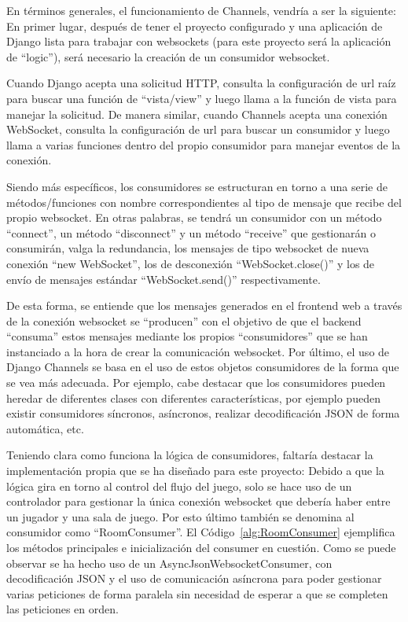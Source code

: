 En términos generales, el funcionamiento de Channels, vendría a ser la siguiente: En primer lugar, después de tener el proyecto configurado y una aplicación de Django lista para
trabajar con websockets (para este proyecto será la aplicación de ``logic''), será necesario la creación de un 
consumidor websocket.

Cuando Django acepta una solicitud HTTP, consulta la configuración de url raíz para buscar una función de ``vista/view'' y luego 
llama a la función de vista para manejar la solicitud. De manera similar, cuando Channels acepta una conexión WebSocket, 
consulta la configuración de url para buscar un consumidor y luego llama a varias funciones dentro del propio consumidor 
para manejar eventos de la conexión.

Siendo más específicos, los consumidores se estructuran en torno a una serie de métodos/funciones con nombre correspondientes al tipo de mensaje 
que recibe del propio websocket. En otras palabras, se tendrá un consumidor con un método ``connect'', un método ``disconnect'' y un método ``receive'' 
que gestionarán o consumirán, valga la redundancia, los mensajes de tipo websocket de nueva conexión ``new WebSocket'', los de desconexión 
``WebSocket.close()'' y los de envío de mensajes estándar ``WebSocket.send()'' respectivamente.

De esta forma, se entiende que los mensajes generados en el frontend web a través de la conexión websocket se ``producen'' con el objetivo
de que el backend ``consuma'' estos mensajes mediante los propios ``consumidores'' que se han instanciado a la hora de crear la comunicación websocket. 
Por último, el uso de Django Channels se basa en el uso de estos objetos consumidores de la forma que se vea 
más adecuada. Por ejemplo, cabe destacar que los consumidores pueden heredar de diferentes clases con diferentes características,
por ejemplo pueden existir consumidores síncronos, asíncronos, realizar decodificación JSON de forma automática, etc.

Teniendo clara como funciona la lógica de consumidores, faltaría destacar la implementación propia que se ha diseñado para este proyecto: Debido a que 
la lógica gira en torno al control del flujo del juego, solo se hace uso de un controlador para gestionar la única conexión websocket que debería haber entre
un jugador y una sala de juego. Por esto último también se denomina al consumidor como ``RoomConsumer''. El Código~\ref{alg:RoomConsumer} ejemplifica los métodos 
principales e inicialización del consumer en cuestión. Como se puede observar se ha hecho uso de un AsyncJsonWebsocketConsumer, con decodificación JSON y el uso de 
comunicación asíncrona para poder gestionar varias peticiones de forma paralela sin necesidad de esperar a que se completen las peticiones en orden.

